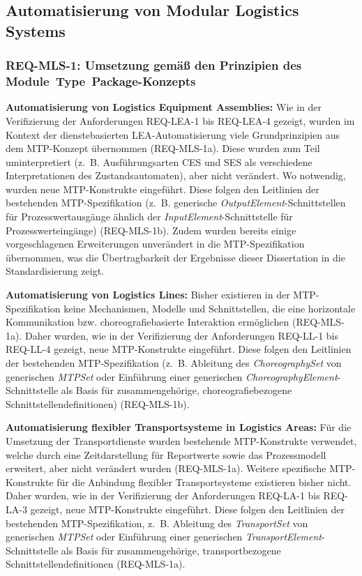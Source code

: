 \subsection{Automatisierung von Modular Logistics Systems}

\subsubsection{REQ-MLS-1: Umsetzung gemäß den Prinzipien des Module~Type~Package-Konzepts}

\textbf{Automatisierung von Logistics Equipment Assemblies:} Wie in der Verifizierung der Anforderungen REQ-LEA-1 bis REQ-LEA-4 gezeigt, wurden im Kontext der dienstebasierten LEA-Automatisierung viele Grundprinzipien aus dem MTP-Konzept übernommen (REQ-MLS-1a). Diese wurden zum Teil uminterpretiert (z.~B. Ausführungsarten CES und SES als verschiedene Interpretationen des Zustandsautomaten), aber nicht verändert. Wo notwendig, wurden neue MTP-Konstrukte eingeführt. Diese folgen den Leitlinien der bestehenden MTP-Spezifikation (z.~B. generische \emph{OutputElement}-Schnittstellen für Prozesswertausgänge ähnlich der \emph{InputElement}-Schnittstelle für Prozesswerteingänge) (REQ-MLS-1b). Zudem wurden bereits einige vorgeschlagenen Erweiterungen unverändert in die MTP-Spezifikation übernommen, was die Übertragbarkeit der Ergebnisse dieser Dissertation in die Standardisierung zeigt. 

\textbf{Automatisierung von Logistics Lines:} Bisher existieren in der MTP-Spe\-zi\-fi\-ka\-ti\-on keine Mechanismen, Modelle und Schnittstellen, die eine horizontale Kommunikation bzw. choreografiebasierte Interaktion ermöglichen (REQ-MLS-1a). Daher wurden, wie in der Verifizierung der Anforderungen REQ-LL-1 bis REQ-LL-4 gezeigt, neue MTP-Konstrukte eingeführt. Diese folgen den Leitlinien der bestehenden MTP-Spezifikation (z.~B. Ableitung des \emph{ChoreographySet} von generischen \emph{MTPSet} oder Einführung einer generischen \emph{ChoreographyElement}-Schnittstelle als Basis für zusammengehörige, choreografiebezogene Schnittstellendefinitionen) (REQ-MLS-1b). 
 
\textbf{Automatisierung flexibler Transportsysteme in Logistics Areas:} Für die Umsetzung der Transportdienste wurden bestehende MTP-Konstrukte verwendet, welche durch eine Zeitdarstellung für Reportwerte sowie das Prozessmodell erweitert, aber nicht verändert wurden (REQ-MLS-1a). Weitere spezifische MTP-Konstrukte für die Anbindung flexibler Transportsysteme existieren bisher nicht. Daher wurden, wie in der Verifizierung der Anforderungen REQ-LA-1 bis REQ-LA-3 gezeigt, neue MTP-Konstrukte eingeführt. Diese folgen den Leitlinien der bestehenden MTP-Spezifikation, z.~B. Ableitung des \emph{TransportSet} von generischen \emph{MTPSet} oder Einführung einer generischen \emph{TransportElement}-Schnittstelle als Basis für zusammengehörige, transportbezogene Schnittstellendefinitionen (REQ-MLS-1a).

